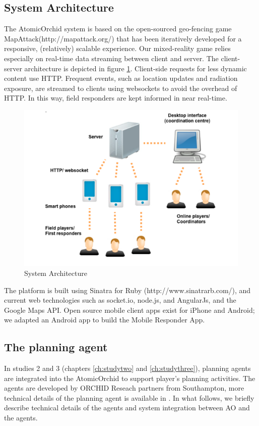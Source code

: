 \subsection{System Architecture}
The AtomicOrchid system is based on the open-sourced geo-fencing game MapAttack(http://mapattack.org/) that has been iteratively developed for a responsive, (relatively) scalable experience. Our mixed-reality game relies especially on real-time data streaming between client and server. The client-server architecture is depicted in figure \ref{fig:sysArchitecture}. Client-side requests for less dynamic content use HTTP. Frequent events, such as location updates and radiation exposure, are streamed to clients using websockets to avoid the overhead of HTTP. In this way, field responders are kept informed in near real-time.\\

\begin{figure}[h]
  \centering
  \includegraphics[width=1\textwidth]{img/approach/systemArchitecture}
  \caption{System Architecture}
  \label{fig:sysArchitecture}
\end{figure}

The platform is built using Sinatra for Ruby (http://www.sinatrarb.com/), and current web technologies such as socket.io, node.js, and AngularJs, and the Google Maps API. Open source mobile client apps exist for iPhone and Android; we adapted an Android app to build the Mobile Responder App.\\


\subsection{The planning agent}\label{sec:appagent}
In studies 2 and 3 (chapters \ref{ch:studytwo} and \ref{ch:studythree}), planning agents are integrated into the AtomicOrchid to support player's planning activities. The agents are developed by ORCHID Reseach partners from Southampton, more technical details of the planning agent is available in \cite{Ramchurn2015a}. In what follows, we briefly describe technical details of the agents and system integration between \ac{AO} and the agents.  \\

